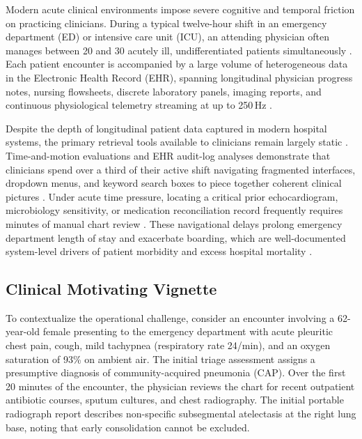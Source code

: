 \documentclass[12pt]{article}
\begin{document}
Modern acute clinical environments impose severe cognitive and temporal friction on practicing clinicians. During a typical twelve-hour shift in an emergency department (ED) or intensive care unit (ICU), an attending physician often manages between 20 and 30 acutely ill, undifferentiated patients simultaneously \cite{topol2019high,miotto2018deep}. Each patient encounter is accompanied by a large volume of heterogeneous data in the Electronic Health Record (EHR), spanning longitudinal physician progress notes, nursing flowsheets, discrete laboratory panels, imaging reports, and continuous physiological telemetry streaming at up to 250\,Hz \cite{johnson2023mimic,hyland2020hirid}.

Despite the depth of longitudinal patient data captured in modern hospital systems, the primary retrieval tools available to clinicians remain largely static \cite{sutton2020overview,wornow2023shaky}. Time-and-motion evaluations and EHR audit-log analyses demonstrate that clinicians spend over a third of their active shift navigating fragmented interfaces, dropdown menus, and keyword search boxes to piece together coherent clinical pictures \cite{sinsky2016allocation,zheng2021analyzing}. Under acute time pressure, locating a critical prior echocardiogram, microbiology sensitivity, or medication reconciliation record frequently requires minutes of manual chart review \cite{obermeyer2016predicting,singh2014types}. These navigational delays prolong emergency department length of stay and exacerbate boarding, which are well-documented system-level drivers of patient morbidity and excess hospital mortality \cite{singer2011crowding,pines2011emergency,singh2014types}.

\subsection*{Clinical Motivating Vignette}

To contextualize the operational challenge, consider an encounter involving a 62-year-old female presenting to the emergency department with acute pleuritic chest pain, cough, mild tachypnea (respiratory rate 24/min), and an oxygen saturation of 93\% on ambient air. The initial triage assessment assigns a presumptive diagnosis of community-acquired pneumonia (CAP). Over the first 20 minutes of the encounter, the physician reviews the chart for recent outpatient antibiotic courses, sputum cultures, and chest radiography. The initial portable radiograph report describes non-specific subsegmental atelectasis at the right lung base, noting that early consolidation cannot be excluded.
\end{document}
